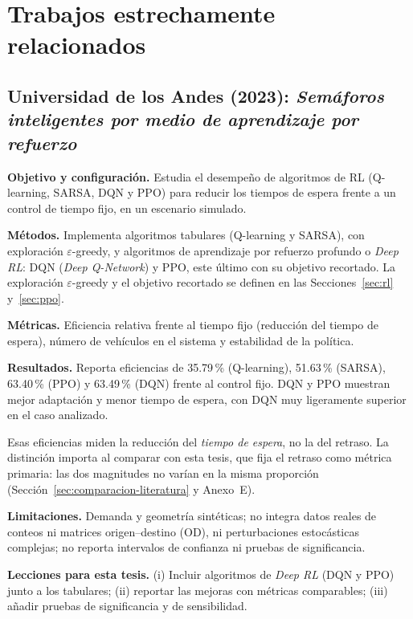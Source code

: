 \section{Trabajos estrechamente relacionados}
\label{sec:relacionados}

\subsection[Universidad de los Andes (2023)]{Universidad de los Andes (2023): \textit{Semáforos inteligentes por medio de aprendizaje por refuerzo} \citep{Chavez2023}}

\noindent\textbf{Objetivo y configuración.} Estudia el desempeño de algoritmos de RL (Q-learning, SARSA, DQN y PPO) para reducir los tiempos de espera frente a un control de tiempo fijo, en un escenario simulado.

\noindent\textbf{Métodos.} Implementa algoritmos tabulares (Q-learning y SARSA), con exploración $\varepsilon$-greedy, y algoritmos de aprendizaje por refuerzo profundo o \textit{Deep RL}: DQN (\textit{Deep Q-Network}) y PPO, este último con su objetivo recortado. La exploración $\varepsilon$-greedy y el objetivo recortado se definen en las Secciones~\ref{sec:rl} y~\ref{sec:ppo}.

\noindent\textbf{Métricas.} Eficiencia relativa frente al tiempo fijo (reducción del tiempo de espera), número de vehículos en el sistema y estabilidad de la política.

\noindent\textbf{Resultados.} Reporta eficiencias de 35.79\,\% (Q-learning), 51.63\,\% (SARSA), 63.40\,\% (PPO) y 63.49\,\% (DQN) frente al control fijo. DQN y PPO muestran mejor adaptación y menor tiempo de espera, con DQN muy ligeramente superior en el caso analizado.

Esas eficiencias miden la reducción del \emph{tiempo de espera}, no la del retraso. La distinción importa al comparar con esta tesis, que fija el retraso como métrica primaria: las dos magnitudes no varían en la misma proporción (Sección~\ref{sec:comparacion-literatura} y Anexo~E).

\noindent\textbf{Limitaciones.} Demanda y geometría sintéticas; no integra datos reales de conteos ni matrices origen--destino (OD), ni perturbaciones estocásticas complejas; no reporta intervalos de confianza ni pruebas de significancia.

\noindent\textbf{Lecciones para esta tesis.} (i) Incluir algoritmos de \textit{Deep RL} (DQN y PPO) junto a los tabulares; (ii) reportar las mejoras con métricas comparables; (iii) añadir pruebas de significancia y de sensibilidad.


